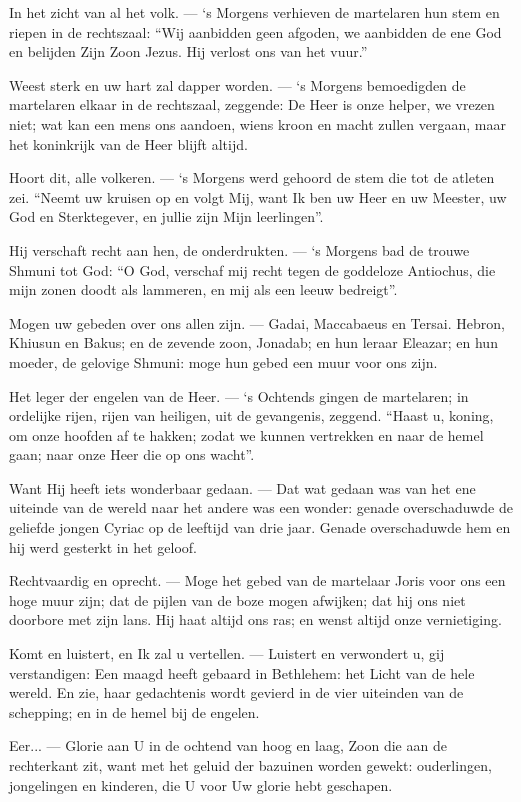 \documentclass[12pt,twoside,a5paper]{article}
\newlength{\origparskip}
\newenvironment{halfparskip}{
  \setlength{\parskip}{0.5\origparskip}
}{
  \setlength{\parskip}{\origparskip}
}
\begin{document}
\begin{halfparskip}
  In het zicht van al het volk. --- `s Morgens verhieven de martelaren hun stem en riepen in de rechtszaal: ``Wij aanbidden geen afgoden, we aanbidden de ene God en belijden Zijn Zoon Jezus. Hij verlost ons van het vuur.''

  Weest sterk en uw hart zal dapper worden. --- `s Morgens bemoedigden de martelaren elkaar in de rechtszaal, zeggende: De Heer is onze helper, we vrezen niet; wat kan een mens ons aandoen, wiens kroon en macht zullen vergaan, maar het koninkrijk van de Heer blijft altijd.

  Hoort dit, alle volkeren. --- `s Morgens werd gehoord de stem die tot de atleten zei. ``Neemt uw kruisen op en volgt Mij, want Ik ben uw Heer en uw Meester, uw God en Sterktegever, en jullie zijn Mijn leerlingen''.

  Hij verschaft recht aan hen, de onderdrukten. --- `s Morgens bad de trouwe Shmuni tot God: ``O God, verschaf mij recht tegen de goddeloze Antiochus, die mijn zonen doodt als lammeren, en mij als een leeuw bedreigt''.

  Mogen uw gebeden over ons allen zijn. --- Gadai, Maccabaeus en Tersai. Hebron, Khiusun en Bakus; en de zevende zoon, Jonadab; en hun leraar Eleazar; en hun moeder, de gelovige Shmuni: moge hun gebed een muur voor ons zijn.

  Het leger der engelen van de Heer. --- `s Ochtends gingen de martelaren; in ordelijke rijen, rijen van heiligen, uit de gevangenis, zeggend. ``Haast u, koning, om onze hoofden af te hakken; zodat we kunnen vertrekken en naar de hemel gaan; naar onze Heer die op ons wacht''.

  Want Hij heeft iets wonderbaar gedaan. --- Dat wat gedaan was van het ene uiteinde van de wereld naar het andere was een wonder: genade overschaduwde de geliefde jongen Cyriac op de leeftijd van drie jaar. Genade overschaduwde hem en hij werd gesterkt in het geloof.

  Rechtvaardig en oprecht. --- Moge het gebed van de martelaar Joris voor ons een hoge muur zijn; dat de pijlen van de boze mogen afwijken; dat hij ons niet doorbore met zijn lans. Hij haat altijd ons ras; en wenst altijd onze vernietiging.

  Komt en luistert, en Ik zal u vertellen. --- Luistert en verwondert u, gij verstandigen: Een maagd heeft gebaard in Bethlehem: het Licht van de hele wereld. En zie, haar gedachtenis wordt gevierd in de vier uiteinden van de schepping; en in de hemel bij de engelen.

  Eer... --- Glorie aan U in de ochtend van hoog en laag, Zoon die aan de rechterkant zit, want met het geluid der bazuinen worden gewekt: ouderlingen, jongelingen en kinderen, die U voor Uw glorie hebt geschapen.


\end{halfparskip}
\end{document}
